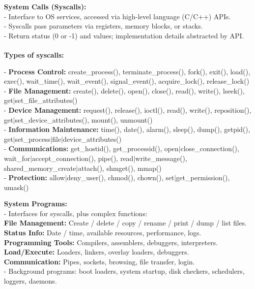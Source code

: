 \textbf{System Calls (Syscalls):} \\
- Interface to OS services, accessed via high-level language (C/C++) APIs. \\
- Syscalls pass parameters via registers, memory blocks, or stacks. \\
- Return status (0 or -1) and values; implementation details abstracted by API.\\ \\
\textbf{Types of syscalls:}
\begin{flushleft}
- \textbf{Process Control:} create\_process(), terminate\_process(), fork(), exit(), load(), exec(), wait\_time(), wait\_event(), signal\_event(), acquire\_lock(), release\_lock()\\
- \textbf{File Management:} create(), delete(), open(), close(), read(), write(), lseek(), get$\mid$set\_file\_attributes() \\
- \textbf{Device Management:} request(), release(), ioctl(), read(), write(), reposition(), get$\mid$set\_device\_attributes(), mount(), unmount() \\
- \textbf{Information Maintenance:} time(), date(), alarm(), sleep(), dump(), getpid(), get$\mid$set\_process$\mid$file$\mid$device\_attributes()\\
- \textbf{Communications:} get\_hostid(), get\_processid(), open$\mid$close\_connection(), wait\_for$\mid$accept\_connection(), pipe(), read$\mid$write\_message(), shared\_memory\_create$\mid$attach(), shmget(), mmap()\\
- \textbf{Protection:} allow$\mid$deny\_user(), chmod(), chown(), set$\mid$get\_permission(), umask()\\
\end{flushleft}

\textbf{System Programs:} \\
- Interfaces for syscalls, plus complex functions: \\
\textbf{File Management:} Create / delete / copy / rename / print / dump / list files. \\
\textbf{Status Info:} Date / time, available resources, performance, logs. \\
\textbf{Programming Tools:} Compilers, assemblers, debuggers, interpreters. \\
\textbf{Load/Execute:} Loaders, linkers, overlay loaders, debuggers. \\
\textbf{Communication:} Pipes, sockets, browsing, file transfer, login. \\
- Background programs: boot loaders, system startup, disk checkers, schedulers, loggers, daemons. \\

